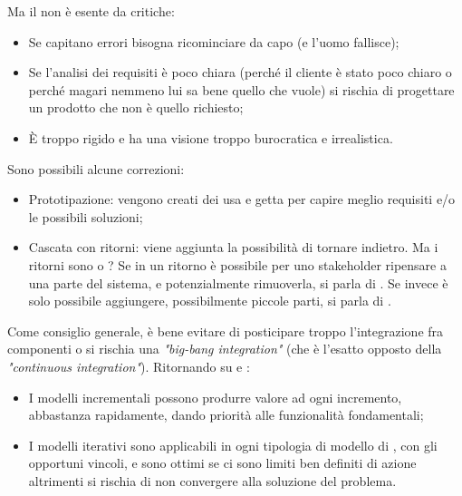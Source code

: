 \documentclass[../main]{subfiles}
\begin{document}
Ma il  non è esente da critiche:
\begin{itemize}
    \item Se capitano errori bisogna ricominciare da capo (e l'uomo fallisce);
    \item Se l'analisi dei requisiti è poco chiara (perché il cliente è stato poco chiaro o perché magari nemmeno lui sa bene quello che vuole) si rischia di progettare un prodotto che non è quello richiesto;
    \item È troppo rigido e ha una visione troppo burocratica e irrealistica.
\end{itemize}
Sono possibili alcune correzioni:
\begin{itemize}
    \item Prototipazione: vengono creati dei  usa e getta per capire meglio requisiti e/o le possibili soluzioni;
    \item Cascata con ritorni: viene aggiunta la possibilità di tornare indietro. Ma i ritorni sono  o ? Se in un ritorno è possibile per uno stakeholder ripensare a una parte del sistema, e potenzialmente rimuoverla, si parla di . Se invece è solo possibile aggiungere, possibilmente piccole parti, si parla di .
\end{itemize}
Come consiglio generale, è bene evitare di posticipare troppo l'integrazione fra componenti o si rischia una \textit{"big-bang integration"} (che è l'esatto opposto della \textit{"continuous integration"}).\newline
Ritornando su  e :
\begin{itemize}
    \item I modelli incrementali possono produrre valore ad ogni incremento, abbastanza rapidamente, dando priorità alle funzionalità fondamentali;
    \item I modelli iterativi sono applicabili in ogni tipologia di modello di , con gli opportuni vincoli, e sono ottimi se ci sono limiti ben definiti di azione altrimenti si rischia di non convergere alla soluzione del problema.
\end{itemize}
\end{document}
